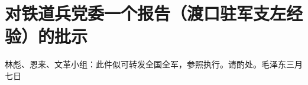 \section[对铁道兵党委一个报告（渡口驻军支左经验）的批示（一九六七年三月七日）]{对铁道兵党委一个报告（渡口驻军支左经验）的批示}


林彪、恩来、文革小组：此件似可转发全国全军，参照执行。请酌处。毛泽东三月七日

